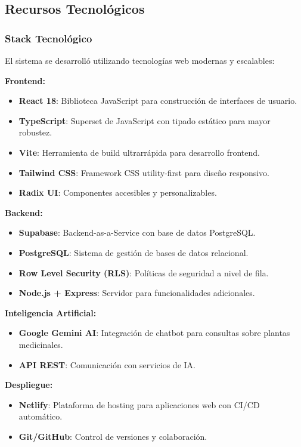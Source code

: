 \documentclass[12pt,a4paper]{article}
\begin{document}
\subsection{Recursos Tecnológicos}

\subsubsection{Stack Tecnológico}

El sistema se desarrolló utilizando tecnologías web modernas y escalables:

\textbf{Frontend:}
\begin{itemize}
    \item \textbf{React 18}: Biblioteca JavaScript para construcción de interfaces de usuario.
    \item \textbf{TypeScript}: Superset de JavaScript con tipado estático para mayor robustez.
    \item \textbf{Vite}: Herramienta de build ultrarrápida para desarrollo frontend.
    \item \textbf{Tailwind CSS}: Framework CSS utility-first para diseño responsivo.
    \item \textbf{Radix UI}: Componentes accesibles y personalizables.
\end{itemize}

\textbf{Backend:}
\begin{itemize}
    \item \textbf{Supabase}: Backend-as-a-Service con base de datos PostgreSQL.
    \item \textbf{PostgreSQL}: Sistema de gestión de bases de datos relacional.
    \item \textbf{Row Level Security (RLS)}: Políticas de seguridad a nivel de fila.
    \item \textbf{Node.js + Express}: Servidor para funcionalidades adicionales.
\end{itemize}

\textbf{Inteligencia Artificial:}
\begin{itemize}
    \item \textbf{Google Gemini AI}: Integración de chatbot para consultas sobre plantas medicinales.
    \item \textbf{API REST}: Comunicación con servicios de IA.
\end{itemize}

\textbf{Despliegue:}
\begin{itemize}
    \item \textbf{Netlify}: Plataforma de hosting para aplicaciones web con CI/CD automático.
    \item \textbf{Git/GitHub}: Control de versiones y colaboración.
\end{itemize}
\end{document}
